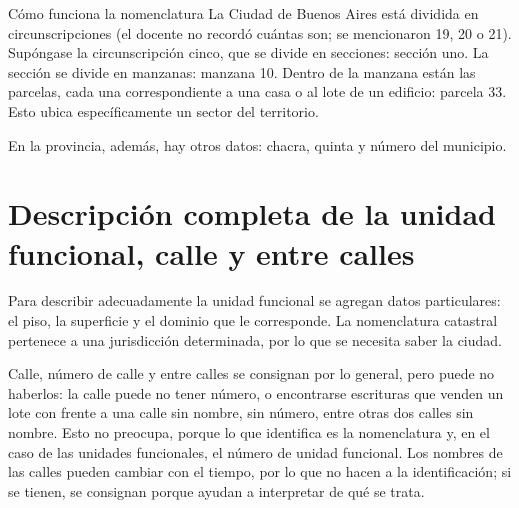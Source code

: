 \documentclass[12pt,oneside]{book}
\begin{document}
\begin{example}{Cómo funciona la nomenclatura}
La Ciudad de Buenos Aires está dividida en circunscripciones (el docente no recordó cuántas son; se mencionaron 19, 20 o 21). Supóngase la circunscripción cinco, que se divide en secciones: sección uno. La sección se divide en manzanas: manzana 10. Dentro de la manzana están las parcelas, cada una correspondiente a una casa o al lote de un edificio: parcela 33. Esto ubica específicamente un sector del territorio. %
\end{example}

En la provincia, además, hay otros datos: chacra, quinta y número del municipio.

\section{Descripción completa de la unidad funcional, calle y entre calles}

Para describir adecuadamente la unidad funcional se agregan datos particulares: el piso, la superficie y el dominio que le corresponde. La nomenclatura catastral pertenece a una jurisdicción determinada, por lo que se necesita saber la ciudad.

Calle, número de calle y entre calles se consignan por lo general, pero puede no haberlos: la calle puede no tener número, o encontrarse escrituras que venden un lote con frente a una calle sin nombre, sin número, entre otras dos calles sin nombre. Esto no preocupa, porque lo que identifica es la nomenclatura y, en el caso de las unidades funcionales, el número de unidad funcional. Los nombres de las calles pueden cambiar con el tiempo, por lo que no hacen a la identificación; si se tienen, se consignan porque ayudan a interpretar de qué se trata.
\end{document}
